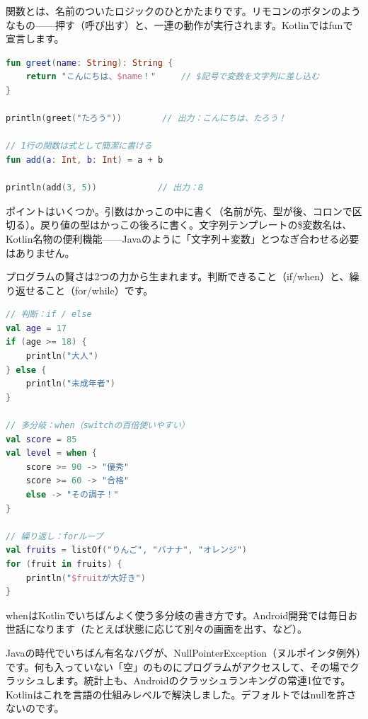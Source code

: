 
関数とは、名前のついたロジックのひとかたまりです。リモコンのボタンのようなもの——押す（呼び出す）と、一連の動作が実行されます。Kotlinではfunで宣言します。

\begin{lstlisting}[language=Kotlin]
fun greet(name: String): String {
    return "こんにちは、$name！"     // $記号で変数を文字列に差し込む
}

println(greet("たろう"))        // 出力：こんにちは、たろう！

// 1行の関数は式として簡潔に書ける
fun add(a: Int, b: Int) = a + b

println(add(3, 5))            // 出力：8
\end{lstlisting}

ポイントはいくつか。引数はかっこの中に書く（名前が先、型が後、コロンで区切る）。戻り値の型はかっこの後ろに書く。文字列テンプレートの\$変数名は、Kotlin名物の便利機能——Javaのように「文字列＋変数」とつなぎ合わせる必要はありません。


プログラムの賢さは2つの力から生まれます。判断できること（if/when）と、繰り返せること（for/while）です。

\begin{lstlisting}[language=Kotlin]
// 判断：if / else
val age = 17
if (age >= 18) {
    println("大人")
} else {
    println("未成年者")
}

// 多分岐：when（switchの百倍使いやすい）
val score = 85
val level = when {
    score >= 90 -> "優秀"
    score >= 60 -> "合格"
    else -> "その調子！"
}

// 繰り返し：forループ
val fruits = listOf("りんご", "バナナ", "オレンジ")
for (fruit in fruits) {
    println("$fruitが大好き")
}
\end{lstlisting}

whenはKotlinでいちばんよく使う多分岐の書き方です。Android開発では毎日お世話になります（たとえば状態に応じて別々の画面を出す、など）。


Javaの時代でいちばん有名なバグが、NullPointerException（ヌルポインタ例外）です。何も入っていない「空」のものにプログラムがアクセスして、その場でクラッシュします。統計上も、Androidのクラッシュランキングの常連1位です。Kotlinはこれを言語の仕組みレベルで解決しました。デフォルトではnullを許さないのです。


